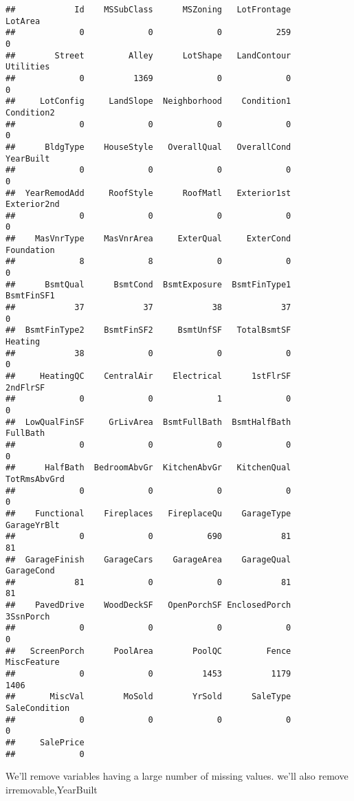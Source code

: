\documentclass[]{article}
\begin{document}
\begin{verbatim}
##            Id    MSSubClass      MSZoning   LotFrontage       LotArea 
##             0             0             0           259             0 
##        Street         Alley      LotShape   LandContour     Utilities 
##             0          1369             0             0             0 
##     LotConfig     LandSlope  Neighborhood    Condition1    Condition2 
##             0             0             0             0             0 
##      BldgType    HouseStyle   OverallQual   OverallCond     YearBuilt 
##             0             0             0             0             0 
##  YearRemodAdd     RoofStyle      RoofMatl   Exterior1st   Exterior2nd 
##             0             0             0             0             0 
##    MasVnrType    MasVnrArea     ExterQual     ExterCond    Foundation 
##             8             8             0             0             0 
##      BsmtQual      BsmtCond  BsmtExposure  BsmtFinType1    BsmtFinSF1 
##            37            37            38            37             0 
##  BsmtFinType2    BsmtFinSF2     BsmtUnfSF   TotalBsmtSF       Heating 
##            38             0             0             0             0 
##     HeatingQC    CentralAir    Electrical      1stFlrSF      2ndFlrSF 
##             0             0             1             0             0 
##  LowQualFinSF     GrLivArea  BsmtFullBath  BsmtHalfBath      FullBath 
##             0             0             0             0             0 
##      HalfBath  BedroomAbvGr  KitchenAbvGr   KitchenQual  TotRmsAbvGrd 
##             0             0             0             0             0 
##    Functional    Fireplaces   FireplaceQu    GarageType   GarageYrBlt 
##             0             0           690            81            81 
##  GarageFinish    GarageCars    GarageArea    GarageQual    GarageCond 
##            81             0             0            81            81 
##    PavedDrive    WoodDeckSF   OpenPorchSF EnclosedPorch     3SsnPorch 
##             0             0             0             0             0 
##   ScreenPorch      PoolArea        PoolQC         Fence   MiscFeature 
##             0             0          1453          1179          1406 
##       MiscVal        MoSold        YrSold      SaleType SaleCondition 
##             0             0             0             0             0 
##     SalePrice 
##             0
\end{verbatim}

We'll remove variables having a large number of missing values. we'll
also remove irremovable,YearBuilt
\end{document}
